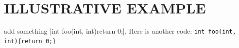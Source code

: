 \section{ILLUSTRATIVE EXAMPLE}
add something
\myinline|int foo(int, int){return 0;}|. Here is another code: \texttt{int foo(int, int)\{return 0;\}}